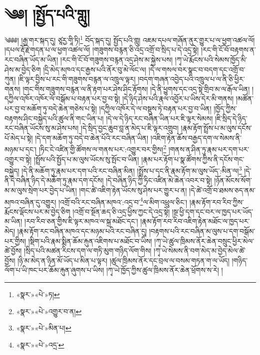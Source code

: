 \chapter{༄༅། །སྤྱོད་པའི་གླུ།}༄༅༅། །རྒྱ་གར་སྐད་དུ། ཙཱརྱ་གཱི་ཏི།\footnote{«སྣར་»«པེ་»ཏ།} བོད་སྐད་དུ། སྤྱོད་པའི་གླུ། འཇམ་དཔལ་གཞོན་ནུར་གྱུར་པ་ལ་ཕྱག་འཚལ་ལོ། །དཔལ་རྡོ་རྗེ་གདན་པ་ལ་ཕྱག་འཚལ་ལོ། །གཟུགས་བརྙན་ཅི་འདྲ་འགྲོ་བ་སྲིད་པ་དེ་འདྲ་སྟེ། །རང་གི་ངོ་བོ་བརྟགས་ན་རང་བཞིན་ཡོད་མ་ཡིན། །རང་གི་ངོ་བོ་གཟུགས་བརྙན་འདྲ་ཤེས་མ་སྐྱེས་པས། །ཀྭ་ཡེ་རྨོངས་པའི་སེམས་ཁྱོད་མི་ཤེས་མ་བྱེད་ཅིག །དྲི་མེད་མཁའ་དང་རྒྱས་པའི་ནོར་བུ་མེ་ལོང་ལ། །དེ་ལ་གསལ་བར་སྣང་བ་བདག་དང་འགྲོ་བ་ཀུན། །ཇི་ལྟར་བྱིས་པ་རང་གི་གཟུགས་བརྙན་ལ་འཁྲུལ་ལྟར། །བདག་གཞན་འབྱེད་པའི་འཁྲུལ་པ་ལ་ནི་ཅི་ཕྱིར་གནས། །གང་གིས་གཟུགས་བརྙན་ལ་ནི་རྟག་པར་ཤེས་ཤིང་རྟོགས། །དེ་ནི་ཕྱུགས་དང་འདྲ་སྟེ་གྲིབ་མ་ལ་རྒོལ་ཡིན། །དཀྱིལ་འཁོར་འཁོར་ལོ་བསྒོམ་པ་བརྟན་པར་བྱ་བ་སྟེ། །དེ་ཉིད་ཤེས་པའི་རྣལ་འབྱོར་པ་ཡིས་དེར་མི་གནས། །མཚོན་པར་བྱ་བ་མཆོག་ཏུ་བདེ་ཆེན་གཅེས་པ་སྟེ། །དཀྱིལ་འཁོར་དེ་ལ་བསྡུས་ཏེ་བརྟན་པར་བྱ་བ་ཡིན། །ཁྱོད་ཀྱིས་བརྟགས་ཤིང་བསྐྱེད་པའི་ཚུལ་ནི་གང་ཡིན་པ། །དེ་ལ་དེ་ཉིད་རང་བཞིན་ཡིན་པར་ཇི་ལྟར་སེམས། །ཇི་སྲིད་དེ་ཉིད་རང་བཞིན་ཡོངས་སུ་མ་ཤེས་པས། །དེ་སྲིད་བྱང་ཆུབ་བླ་ན་མེད་པ་ཇི་ལྟར་འགྲུབ། །རྣམ་རྟོག་སྤྲོས་པ་མ་ལུས་དངོས་པོ་མེད་པ་སྟེ། །དེ་དག་མཆོག་ཏུ་བདེ་བ་ཆེན་པོའི་རང་བཞིན་ཡིན། །འཇིག་རྟེན་ཆོས་བརྒྱད་དག་ལ་སེམས་ནི་མཉམ་པ་དང་། །ཏིང་ངེ་འཛིན་གྱི་ཚོགས་ལ་གནས་པར་:འགྱུར་བར་གྱིས།\footnote{«སྣར་»«པེ་»འགྱུར་བ་ན།} །གནས་ན་ཤིན་ཏུ་རྣམ་པར་དག་པར་འགྱུར་བ་སྟེ། །སྤྲོས་པའི་སྤྱོད་པ་མ་ལུས་ཡོངས་སུ་སྤོང་བ་ཡིན། །རྣམ་པར་རྟོག་པ་སྣ་ཚོགས་ཀྱིས་ནི་དངོས་གང་བསྐྱེད། །དེ་ནི་མཆོག་ཏུ་རྣམ་པར་དག་པའི་རང་བཞིན་མིན། །སྤྲོས་པ་དང་ནི་རྣམ་རྟོག་མ་ལུས་ཡོད་:མིན་ལ།\footnote{«སྣར་»«པེ་»མིན་པ།} །དེ་ནི་དེ་བཞིན་ཉིད་དེ་མཆོག་ཏུ་རྣམ་དག་དངོས། །དེ་བཞིན་ཉིད་ཀྱི་ཏིང་འཛིན་མེ་ཆེན་འབར་བ་སྟེ། །ཉོན་མོངས་སོག་མ་མ་ལུས་སྲེག་པར་བྱེད་པ་ཡིན། །གང་ཚེ་འཇིག་རྟེན་ཡོངས་སུ་ཤེས་པར་གྱུར་པ་ན། །དེ་ཚེ་འགྲོ་བ་ཐམས་ཅད་ནམ་མཁའ་བཞིན་དུ་འགྱུར། །འགྲོ་བའི་རང་བཞིན་མཁའ་:འདྲ་བ་\footnote{«སྣར་»«པེ་»འདྲ་}ལ་མིག་འཕྲུལ་ཅིང་། །རྣམ་རྟོག་རབ་རིབ་ཀྱིས་རྨོངས་ལྡོངས་པར་མ་བྱེད་ཅིག །འགྲོ་བ་སྔོན་ཆད་ཅི་འདྲ་ཕྱིས་ཀྱང་དེ་འདྲ་སྟེ། །སྔ་ཕྱི་དག་དང་བར་ལ་ཁྱད་པར་ཡོད་མ་ཡིན། །རབ་རིབ་ཅན་གྱིས་ཇི་ལྟར་མཁའ་ལ་སྐྲ་མཐོང་དང་། །རྣམ་རྟོག་རབ་རིབ་འཇིག་རྟེན་མཐོང་ལ་ཁྱད་པར་མེད། །རྣམ་རྟོག་རང་བཞིན་མཁའ་དང་མཉམ་པའི་རང་བཞིན་དུ། །བརྟགས་པའི་རང་བཞིན་མ་ལུས་པ་དག་བསྒོམ་པར་གྱིས། །སྡིག་པའི་རྣམ་སྨིན་ཆོམ་རྐུན་འཇིགས་པ་མཐོང་བ་ཡིས། །ཀྭ་ཡེ་ཚུལ་ཁྲིམས་ནོར་ཆེན་བསྲུང་ཕྱིར་མེལ་ཚེ་བྱོས། །སྲིད་པའི་མཚན་རིངས་དག་ལ་གཏི་མུག་གཉིད་ལོག་གིས། །ཀྭ་ཡེ་སེམས་ནི་བག་མེད་མ་བྱེད་མེལ་ཚེ་བྱོས། །ཉི་མ་མེད་ན་ཉིན་མོ་ཡོད་པ་མིན་པ་ལྟར། །ཚུལ་ཁྲིམས་ནོར་དང་བྲལ་ལ་བསམ་གཏན་ག་ལ་ཡོད། །གཉིད་ལོག་པ་ཡི་ཁང་པར་ཆོམ་རྐུན་ཞུགས་པ་ཡིས། །ཀྭ་ཡེ་ཁྱོད་ཀྱིས་ཚུལ་ཁྲིམས་ནོར་ཆེན་ཕྲོགས་ས་རེ། །
